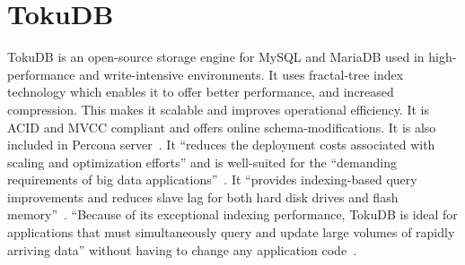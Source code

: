 \section{TokuDB}
 
TokuDB is an open-source storage engine for MySQL and MariaDB used in
high-performance and write-intensive environments. It uses fractal-tree index
technology which enables it to offer better performance, and increased
compression. This makes it scalable and improves operational efficiency. It is
ACID and MVCC compliant and offers online schema-modifications. It is also
included in Percona server~\cite{hid-sp18-516-wiki-tokudb}. It ``reduces the
deployment costs associated with scaling and optimization efforts'' and is
well-suited for the ``demanding requirements of big data
applications''~\cite{hid-sp18-516-percona-tokudb}. It ``provides indexing-based
query improvements and reduces slave lag for both hard disk drives and flash
memory''~\cite{hid-sp18-516-wiki-tokudb}. ``Because of its exceptional indexing
performance, TokuDB is ideal for applications that must simultaneously query and
update large volumes of rapidly arriving data'' without having to change any
application code~\cite{hid-sp18-516-blackbird-si}.
